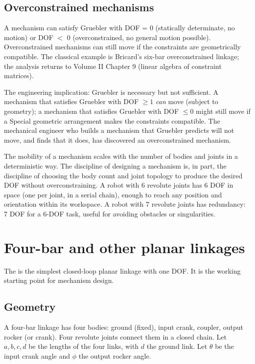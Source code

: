 \subsection{Overconstrained mechanisms}

A mechanism can satisfy Gruebler with DOF = 0 (statically determinate, no motion) or DOF $<$ 0 (overconstrained, no general motion possible). Overconstrained mechanisms can still move if the constraints are geometrically compatible. The classical example is Bricard's six-bar overconstrained linkage; the analysis returns to Volume II Chapter 9 (linear algebra of constraint matrices).

The engineering implication: Gruebler is necessary but not sufficient. A mechanism that satisfies Gruebler with DOF $\geq 1$ \emph{can} move (subject to geometry); a mechanism that satisfies Gruebler with DOF $\leq 0$ might still move if a Special geometric arrangement makes the constraints compatible. The mechanical engineer who builds a mechanism that Gruebler predicts will not move, and finds that it does, has discovered an overconstrained mechanism.

\begin{archetype}[Scaling]
The mobility of a mechanism scales with the number of bodies and joints in a deterministic way. The discipline of designing a mechanism is, in part, the discipline of choosing the body count and joint topology to produce the desired DOF without overconstraining. A robot with 6 revolute joints has 6 DOF in space (one per joint, in a serial chain), enough to reach any position and orientation within its workspace. A robot with 7 revolute joints has redundancy: 7 DOF for a 6-DOF task, useful for avoiding obstacles or singularities.
\end{archetype}

\section{Four-bar and other planar linkages}

The  is the simplest closed-loop planar linkage with one DOF. It is the working starting point for mechanism design.

\subsection{Geometry}

A four-bar linkage has four bodies: ground (fixed), input crank, coupler, output rocker (or crank). Four revolute joints connect them in a closed chain. Let $a, b, c, d$ be the lengths of the four links, with $d$ the ground link. Let $\theta$ be the input crank angle and $\phi$ the output rocker angle.

